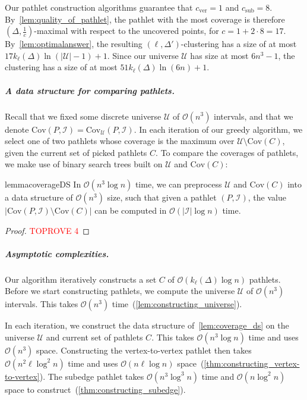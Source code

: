 \documentclass[a4paper,UKenglish,cleveref,thm-restate,notab]{lipics-v2021}
\newcommand{\bigO}{\mathcal{O}}
\newcommand{\I}{\mathcal{I}}
\newcommand{\U}{\mathcal{U}}
\newcommand{\ver}{\mathrm{ver}}
\newcommand{\sub}{\mathrm{sub}}
\newcommand{\Cov}{\ensuremath{\mathrm{Cov}}}
\begin{document}
    Our pathlet construction algorithms guarantee that $c_\ver = 1$ and $c_\sub = 8$.
    By~\cref{lem:quality_of_pathlet}, the pathlet with the most coverage is therefore $(\Delta, \frac{1}{c})$-maximal with respect to the uncovered points, for $c = 1 + 2 \cdot 8 = 17$.
    By~\cref{lem:optimalanswer}, the resulting $(\ell, \Delta')$-clustering has a size of at most $17k_\ell(\Delta) \ln (|\U|-1) + 1$.
    Since our universe $\U$ has size at most $6n^3-1$, the clustering has a size of at most $51k_\ell(\Delta) \ln (6n) + 1$.

\subparagraph*{A data structure for comparing pathlets.}
    Recall that we fixed some discrete universe $\U$ of $\bigO(n^3)$ intervals, and that we denote $\Cov(P, \I) = \Cov_\U(P, \I)$.
    In each iteration of our greedy algorithm, we select one of two pathlets whose  coverage is the maximum over $\U \setminus \Cov(C)$, given the current set of picked pathlets $C$.
    To compare the coverages of pathlets, we make use of binary search trees built on $\U$ and $\Cov(C)$:

    \begin{restatable}{lemma}{coverageDS}
    \label{lem:coverage_ds}
        In $\bigO(n^3 \log n)$ time, we can preprocess $\U$ and $\Cov(C)$ into a data structure of $\bigO(n^3)$ size, such that given a pathlet $(P, \I)$, the value $| \Cov(P, \I) \setminus \Cov(C) |$ can be computed in $\bigO(|\I| \log n)$ time.
    \end{restatable}
    \begin{proof}\textcolor{red}{TOPROVE 4}\end{proof}

\subparagraph*{Asymptotic complexities.}

    Our algorithm iteratively constructs a set $C$ of $\bigO(k_\ell(\Delta) \log n)$ pathlets.
    Before we start constructing pathlets, we compute the universe $\U$ of $\bigO(n^3)$ intervals.
    This takes $\bigO(n^3)$ time~(\cref{lem:constructing_universe}).
    
    In each iteration, we construct the data structure of~\cref{lem:coverage_ds} on the universe $\U$ and current set of pathlets $C$.
    This takes $\bigO(n^3 \log n)$ time and uses $\bigO(n^3)$ space.
    Constructing the vertex-to-vertex pathlet then takes $\bigO(n^2 \ell \log^2 n)$ time and uses $\bigO(n \ell \log n)$ space~(\cref{thm:constructing_vertex-to-vertex}).
    The subedge pathlet takes $\bigO(n^3 \log^3 n)$ time and $\bigO(n \log^2 n)$ space to construct~(\cref{thm:constructing_subedge}).
    
\end{document}
